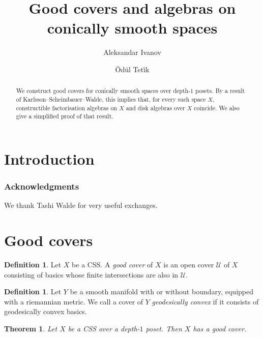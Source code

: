 \documentclass[]{amsart}
\title{{Good covers and algebras on conically smooth spaces}}
\author{Aleksandar Ivanov}
\author{\"Od\"ul Tet\.{i}k}
\date{}
\newcommand{\mcal}[1]{\mathcal{#1}}
\numberwithin{equation}{section}
\theoremstyle{definition}
\newtheorem{definition}[equation]{Definition}%
\theoremstyle{remark}
\theoremstyle{plain}
\newtheorem{theorem}[equation]{Theorem}
\begin{document}
\maketitle

\begin{abstract}
    We construct good covers for conically smooth spaces {\color{MidnightBlue} over depth-$1$ posets}. By a result of Karlsson--Scheimbauer--Walde, this implies that, for every such space $X$, constructible factorisation algebras on $X$ and disk algebras over $X$ coincide. We also give a simplified proof of that result.
\end{abstract}



\tableofcontents

\section{Introduction}

\subsubsection*{Acknowledgments} We thank Tashi Walde for very useful exchanges.

\section{Good covers}

\begin{definition}
    Let $X$ be a CSS. A \emph{good cover} of $X$ is an open cover $\mcal{U}$ of $X$ consisting of basics whose finite intersections are also in $\mcal{U}$.
\end{definition}

\begin{definition}
    Let $Y$ be a smooth manifold with or without boundary, equipped with a riemannian metric. We call a cover of $Y$ \emph{geodesically convex} if it consists of geodesically convex basics.
\end{definition}


\begin{theorem}
    Let $X$ be a CSS {\color{MidnightBlue} over a depth-$1$ poset}. Then $X$ has a good cover.
\end{theorem}
\end{document}
